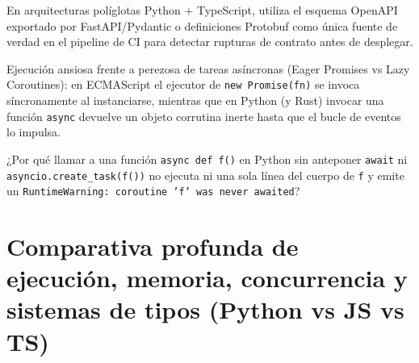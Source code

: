 \documentclass{book}
\begin{document}
\begin{tcolorbox}[title={Consejo}, studiumtip, breakable]

En arquitecturas políglotas Python + TypeScript, utiliza el esquema OpenAPI exportado por FastAPI/Pydantic o definiciones Protobuf como única fuente de verdad en el pipeline de CI para detectar rupturas de contrato antes de desplegar.
\end{tcolorbox}

\begin{tcolorbox}[title={Definición}, studiumdef, breakable]

Ejecución ansiosa frente a perezosa de tareas asíncronas (Eager Promises vs Lazy Coroutines): en ECMAScript el ejecutor de \texttt{new Promise(fn)} se invoca síncronamente al instanciarse, mientras que en Python (y Rust) invocar una función \texttt{async} devuelve un objeto corrutina inerte hasta que el bucle de eventos lo impulsa.
\end{tcolorbox}

\begin{tcolorbox}[title={Autoficha}, studiumcheck, breakable]

¿Por qué llamar a una función \texttt{async def f()} en Python sin anteponer \texttt{await} ni \texttt{asyncio.create\_task(f())} no ejecuta ni una sola línea del cuerpo de \texttt{f} y emite un \texttt{RuntimeWarning: coroutine 'f' was never awaited}?
\end{tcolorbox}

\section{Comparativa profunda de ejecución, memoria, concurrencia y sistemas de tipos (Python vs JS vs TS)}
\end{document}
